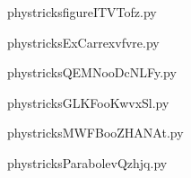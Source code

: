     \newcommand{\CaptionFigfigureITVTofz}{<+Type your caption here+>}
    \begin{center}
        
    \end{center}
    phystricksfigureITVTofz.py

    

    \clearpage
    


    \newcommand{\CaptionFigExCarrexvfvre}{<+Type your caption here+>}
    \begin{center}
        
    \end{center}
    phystricksExCarrexvfvre.py

    

    \clearpage
    


    \newcommand{\CaptionFigQEMNooDcNLFy}{<+Type your caption here+>}
    \begin{center}
        
    \end{center}
    phystricksQEMNooDcNLFy.py

    

    \clearpage
    


    \newcommand{\CaptionFigGLKFooKwvxSl}{<+Type your caption here+>}
    \begin{center}
        
    \end{center}
    phystricksGLKFooKwvxSl.py

    

    \clearpage
    


    \newcommand{\CaptionFigMWFBooZHANAt}{<+Type your caption here+>}
    \begin{center}
        
    \end{center}
    phystricksMWFBooZHANAt.py

    

    \clearpage
    


    \newcommand{\CaptionFigParabolevQzhjq}{<+Type your caption here+>}
    \begin{center}
        
    \end{center}
    phystricksParabolevQzhjq.py

